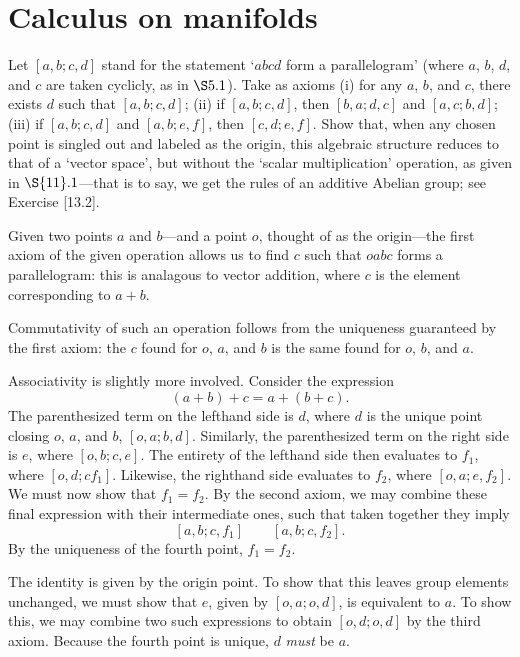 \documentclass[../the-road-to-reality.tex]{subfiles}
\begin{document}
\section{Calculus on manifolds}

\begin{questions}

	\question Let $[a,b;c,d]$ stand for the statement `$abcd$ form a parallelogram' (where $a$, $b$, $d$, and $c$ are taken cyclicly, as in $\S5.1$). Take as axioms (i) for any $a$, $b$, and $c$, there exists $d$ such that $[a,b;c,d]$; (ii) if $[a,b;c,d]$, then $[b,a;d,c]$ and $[a,c;b,d]$; (iii) if $[a,b;c,d]$ and $[a,b;e,f]$, then $[c,d;e,f]$. Show that, when any chosen point is singled out and labeled as the origin, this algebraic structure reduces to that of a `vector space', but without the `scalar multiplication' operation, as given in $\S{11}.1$---that is to say, we get the rules of an additive Abelian group; see Exercise [13.2].

	\begin{solution}
		Given two points $a$ and $b$---and a point $o$, thought of as the origin---the first axiom of the given operation allows us to find $c$ such that $oabc$ forms a parallelogram: this is analagous to vector addition, where $c$ is the element corresponding to $a + b$.

		Commutativity of such an operation follows from the uniqueness guaranteed by the first axiom: the $c$ found for $o$, $a$, and $b$ is the same found for $o$, $b$, and $a$.

		Associativity is slightly more involved. Consider the expression
		\[
			(a + b) + c = a + (b + c)
		.\] 
		The parenthesized term on the lefthand side is $d$, where $d$ is the unique point closing $o$, $a$, and $b$, $[o, a; b, d]$. Similarly, the parenthesized term on the right side is $e$, where $[o, b; c, e]$. The entirety of the lefthand side then evaluates to $f_1$, where $[o, d; c f_1]$. Likewise, the righthand side evaluates to $f_2$, where $[o, a; e, f_2]$. We must now show that $f_1 = f_2$.
		By the second axiom, we may combine these final expression with their intermediate ones, such that taken together they imply
		\[
			[a, b; c, f_1]\qquad[a, b; c, f_2]
		.\] 
		By the uniqueness of the fourth point, $f_1=f_2$.

		The identity is given by the origin point. To show that this leaves group elements unchanged, we must show that $e$, given by $[o, a; o, d]$, is equivalent to $a$. To show this, we may combine two such expressions to obtain $[o, d; o, d]$ by the third axiom. Because the fourth point is unique, $d$ \textit{must} be $a$.


\end{solution}
\end{questions}
\end{document}
